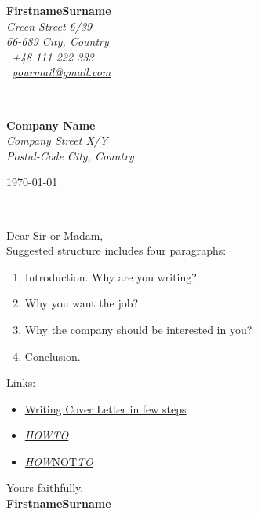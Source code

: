 \documentclass[11pt]{article}
\def\firstname{Firstname}
\def\familyname{Surname}
\def\FileAuthor{\firstname\space\familyname}
\begin{document}
\hfill%
\begin{minipage}[t]{.6\textwidth}
\raggedleft%
{\bfseries \FileAuthor}\\[.35ex]
\small\itshape%
Green Street 6/39\\
66-689 City, Country\\[.35ex]
\Mobilefone~+48 111 222 333\\
\Letter~\href{mailto:yourmail@gmail.com}{yourmail@gmail.com}
\end{minipage}\\[1em]
%
\begin{minipage}[t]{.4\textwidth}
\raggedright%
{\bfseries Company Name}\\[.35ex]
\small\itshape%
Company Street X/Y\\
Postal-Code City, Country
\end{minipage}
\hfill %
\begin{minipage}[t]{.4\textwidth}
\raggedleft %
\today
\end{minipage}\\[2em]
\raggedright
Dear Sir or Madam,\\[1.5em]

Suggested structure includes four paragraphs:
\begin{enumerate}
	\item{Introduction. Why are you writing?}
	\item{Why you want the job?}
	\item{Why the company should be interested in you?}
	\item{Conclusion.}
\end{enumerate}

Links:
\begin{itemize}
	\item \href{http://www.wikihow.com/Write-a-Cover-Letter}{Writing Cover Letter in few steps}
	\item \href{http://www.jobsite.co.uk/hobsons_articles/grt_cov_letter.html}{\textit{HOWTO}}
	\item \href{http://www.kent.ac.uk/careers/cv/coveringletters.htm}{\textit{HOW}NOT\textit{TO}}
\end{itemize}

Yours faithfully,\\[2em] %
%
{\bfseries \FileAuthor}\\
%
\end{document}
